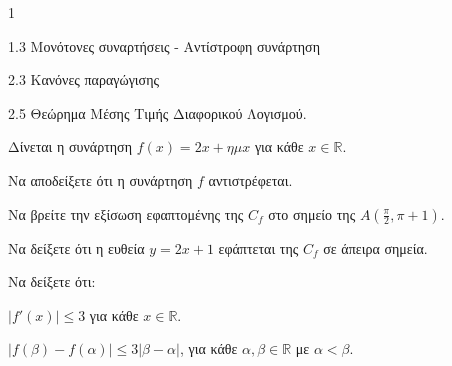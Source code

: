 \begin{ylh}{1}
    \item 1.3 Μονότονες συναρτήσεις - Αντίστροφη συνάρτηση
    \item 2.3 Κανόνες παραγώγισης
    \item 2.5 Θεώρημα Μέσης Τιμής Διαφορικού Λογισμού.
\end{ylh}
Δίνεται η συνάρτηση $f(x)=2x+\eta\mu x$ για κάθε $x \in \mathbb{R}$.
\begin{alist}
\item Να αποδείξετε ότι η συνάρτηση $f$ αντιστρέφεται. 
\item
    \begin{rlist}
    \item Να βρείτε την εξίσωση εφαπτομένης της $C_f$ στο σημείο της $A\left(\frac{\pi}{2},\pi+1\right).$ 
    \item Να δείξετε ότι η ευθεία $y=2x+1$ εφάπτεται της $C_f$ σε άπειρα σημεία. 
    \end{rlist}
\item Να δείξετε ότι:
    \begin{rlist}
    \item $\left|f'(x)\right|\le 3$ για κάθε $x \in \mathbb{R}.$ 
    \item $\left|f(\beta)-f(\alpha)\right|\le 3|\beta-\alpha|$, για κάθε $\alpha,\beta \in \mathbb{R}$ με $\alpha < \beta.$ 
    \end{rlist}
\end{alist}